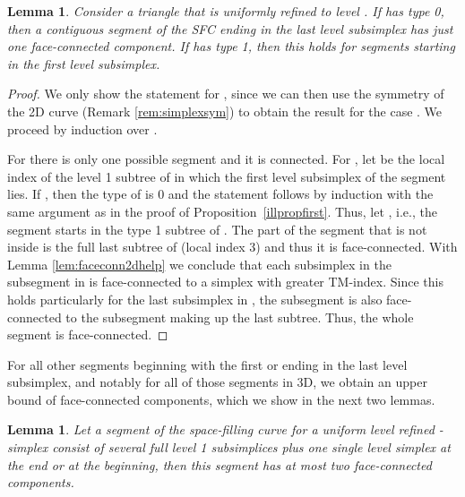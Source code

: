 \documentclass[a4paper,11pt]{article}
\newtheorem{lem}[thm]{Lemma}
\begin{document}
\begin{lem}
  \label{lem:faceconn2d}
 Consider a triangle  that is uniformly refined to level .
 If  has type 0, then a contiguous segment of the SFC ending in the last
 level  subsimplex has just one face-connected component.
 If  has type 1, then this holds for segments starting in the first level
  subsimplex.
\end{lem}
\begin{proof}
  We only show the statement for , since we can then use
  the symmetry of the 2D curve (Remark \ref{rem:simplexsym}) to obtain
  the result for the case .
  We proceed by induction over .

  For  there is only one possible segment and it is connected.
  For , let  be the local index of the level
  1 subtree  of  in which the first level  subsimplex of the segment lies.
  If , then the type of  is 0 and the statement follows
  by induction with the same argument as in the proof of
  Proposition~\ref{illpropfirst}.
  Thus, let , i.e., the segment starts in the type 1 subtree of .
  The part of the segment that is not inside  is the full last subtree of
   (local index 3) and thus it is face-connected.
  With Lemma \ref{lem:faceconn2dhelp} we conclude that each subsimplex in the
  subsegment in  is face-connected to a simplex with greater TM-index.
  Since this holds particularly for the last subsimplex in , the subsegment
  is also face-connected to the subsegment making up the last subtree.
  Thus, the whole segment is face-connected.
\end{proof}

For all other segments beginning with the first or ending in the last level 
subsimplex, and notably for all of those segments in 3D, we obtain an upper
bound of  face-connected components, which we show in the next two lemmas.



\begin{lem}
\label{lem:faceconnlem0}
 Let a segment of the space-filling curve for a uniform level  refined -simplex
 consist of several full level 1 subsimplices plus
 one single
 level  simplex at the end or at the beginning, then this segment has at
 most two face-connected components.
\end{lem}
\end{document}
